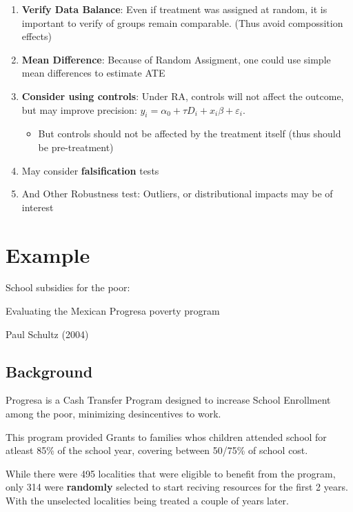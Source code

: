 \documentclass[
  letterpaper,
  DIV=11,
  numbers=noendperiod]{scrartcl}
\providecommand{\tightlist}{%
  \setlength{\itemsep}{0pt}\setlength{\parskip}{0pt}}\usepackage{longtable,booktabs,array}
\begin{document}
\begin{enumerate}
\def\labelenumi{\arabic{enumi}.}
\tightlist
\item
  \textbf{Verify Data Balance}: Even if treatment was assigned at
  random, it is important to verify of groups remain comparable. (Thus
  avoid compossition effects)
\item
  \textbf{Mean Difference}: Because of Random Assigment, one could use
  simple mean differences to estimate ATE
\item
  \textbf{Consider using controls}: Under RA, controls will not affect
  the outcome, but may improve precision:
  \(y_i = \alpha_0 + \tau D_i + x_i\beta + \varepsilon_i\).

  \begin{itemize}
  \tightlist
  \item
    But controls should not be affected by the treatment itself (thus
    should be pre-treatment)
  \end{itemize}
\item
  May consider \textbf{falsification} tests
\item
  And Other Robustness test: Outliers, or distributional impacts may be
  of interest
\end{enumerate}

\hypertarget{example}{%
\section{Example}\label{example}}

School subsidies for the poor:

Evaluating the Mexican Progresa poverty program

Paul Schultz (2004)

\hypertarget{background}{%
\subsection{Background}\label{background}}

Progresa is a Cash Transfer Program designed to increase School
Enrollment among the poor, minimizing desincentives to work.

This program provided Grants to families whos children attended school
for atleast 85\% of the school year, covering between 50/75\% of school
cost.

While there were 495 localities that were eligible to benefit from the
program, only 314 were \textbf{randomly} selected to start reciving
resources for the first 2 years. With the unselected localities being
treated a couple of years later.
\end{document}
